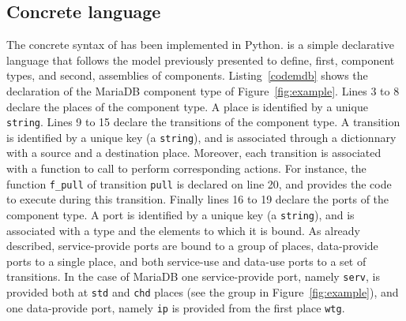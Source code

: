 
\subsection{Concrete language}

The concrete syntax of \mad has been implemented in Python. \mad is a
simple declarative language that follows the model previously
presented to define, first, component types, and second, assemblies of
components. Listing~\ref{codemdb} shows the declaration of the MariaDB
component type of Figure~\ref{fig:example}. Lines 3 to 8 declare
the places of the component type. A place is
identified by a unique \texttt{string}. Lines 9 to 15
declare the transitions of the component type. A transition is
identified by a unique key (a \texttt{string}), and is associated
through a dictionnary with a source and a destination place. Moreover,
each transition is associated with a function to call to perform
corresponding actions. For instance, the function \texttt{f\_pull} of
transition \texttt{pull} is declared on line 20, and provides the code
to execute during this transition. Finally lines 16 to 19 declare the
ports of the component type. A port is identified by a unique key (a
\texttt{string}), and is associated with a type and the elements to
which it is bound. As already described, service-provide ports are
bound to a group of places, data-provide ports to a single place, and
both service-use and data-use ports to a set of transitions. In the
case of MariaDB one service-provide port, namely \texttt{serv}, is
provided both at \texttt{std} and \texttt{chd} places (see the group
in Figure~\ref{fig:example}), and one data-provide port, namely
\texttt{ip} is provided from the first place \texttt{wtg}.



